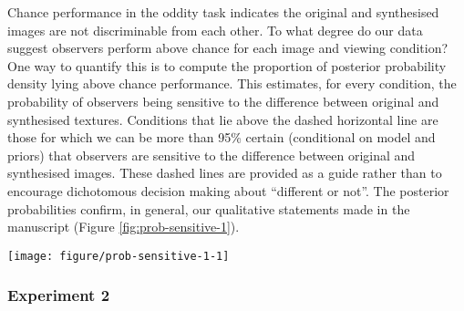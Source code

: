 \documentclass[doc, 11pt,a4paper,natbib]{apa6}\usepackage[]{graphicx}\usepackage[]{color}
\makeatletter
\def\maxwidth{ %
  \ifdim\Gin@nat@width>\linewidth
    \linewidth
  \else
    \Gin@nat@width
  \fi
}
\newenvironment{knitrout}{}{} %
\makeatother
\begin{document}
Chance performance in the oddity task indicates the original and synthesised images are not discriminable from each other.
To what degree do our data suggest observers perform above chance for each image and viewing condition?
One way to quantify this is to compute the proportion of posterior probability density lying above chance performance.
This estimates, for every condition, the probability of observers being sensitive to the difference between original and synthesised textures.
Conditions that lie above the dashed horizontal line are those for which we can be more than 95\% certain (conditional on model and priors) that observers are  sensitive to the difference between original and synthesised images.
These dashed lines are provided as a guide rather than to encourage dichotomous decision making about ``different or not''.
The posterior probabilities confirm, in general, our qualitative statements made in the manuscript (Figure \ref{fig:prob-sensitive-1}).




\begin{knitrout}
\color{fgcolor}\begin{figure*}
\texttt{[image: figure/prob-sensitive-1-1]} \caption[Posterior probability that performance for discriminating each image and image model in Experiment 1 lies above chance.
              Conditions falling above the dashed horizontal line at $0.95$ have a greater than 95\% 
              probability of being discriminable, conditions falling below the dashed horizontal line at $0.05$ are more than 95\% likely to be below-chance.
              Conditions for which the model predicts exactly chance performance would fall at 0.5]{Posterior probability that performance for discriminating each image and image model in Experiment 1 lies above chance.
              Conditions falling above the dashed horizontal line at $0.95$ have a greater than 95\% 
              probability of being discriminable, conditions falling below the dashed horizontal line at $0.05$ are more than 95\% likely to be below-chance.
              Conditions for which the model predicts exactly chance performance would fall at 0.5.}\label{fig:prob-sensitive-1}
\end{figure*}


\end{knitrout}


\subsubsection{Experiment 2}
\end{document}
